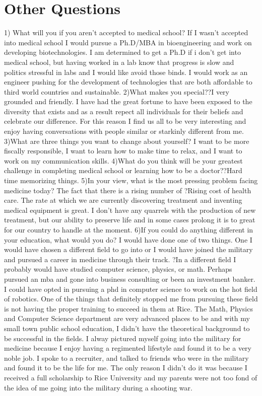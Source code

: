 \documentclass[12pt,a4paper,article]{memoir} %
\begin{document}

\chapter{Other Questions}
1) What will you if you aren't accepted to medical school?
If I wasn't accepted into medical school I would pursue a Ph.D/MBA in bioengineering and work on developing biotechnologies. I am determined to get a Ph.D if i don't get into medical school, but having worked in a lab know that progress is slow and politics stressful in labs and I would like avoid those binds.  I would work as an engineer pushing for the development of technologies that are both affordable to third world countries and sustainable.  
 2)What makes you special??I very grounded and friendly.  I have had the great fortune to have been exposed to the diversity that exists and as a result repect all individuals for their beliefs and celebrate our difference. For this reason I find us all to be very interesting and enjoy having conversations with people similar or starkinly different from me.
3)What are three things you want to change about yourself?
I want to be more fiscally responsible, I want to learn how to make time to relax, and I want to work on my communication skills.
4)What do you think will be your greatest challenge in completing medical school or learning how to be a doctor??Hard time memorizing things. 
5)In your view, what is the most pressing problem facing medicine today?
The fact that there is a rising number of ?Rising cost of health care.  The rate at which we are currently discovering treatment and inventing medical equipment is great.  I don't have any quarrels with the production of new treatment, but our ability to preserve life and in some cases prolong it is to great for our country to handle at the moment.
6)If you could do anything different in your education, what would you do?
I would have done one of two things.  One I would have chosen a different field to go into or I would have joined the military and pursued a career in medicine through their track.  ?In a different field I probably would have studied computer science, physics, or math.  Perhaps pursued an mba and gone into business consulting or been an investment banker.  I could have opted in pursuing a phd in computer science to work on the hot field of robotics.  One of the things that definitely stopped me from pursuing these field is not having the proper training to succeed in them at Rice.  The Math, Physics and Computer Science department are very advanced places to be and with my small town public school education, I didn't have the theoretical background to be successful in the fields.  
I alway pictured myself going into the military for medicine because I enjoy having a regimented lifestyle and found it to be a very noble job.  I spoke to a recruiter, and talked to friends who were in the military and found it to be the life for me.  The only reason I didn't do it was because I received a full scholarship to Rice University and my parents were not too fond of the idea of me going into the military during a shooting war.
\end{document}
